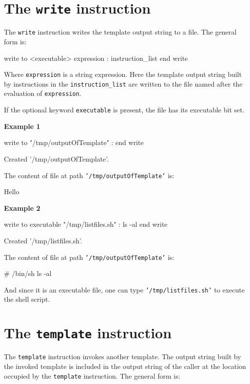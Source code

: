 \documentclass[10pt,openright,twosides]{report}
\newcommand{\gtltype}[1]{{\small\ttfamily #1}}
\newcommand{\gtlinline}[1]{\colorbox{light-blue}{\lstinline[language=gtl]{#1}}}
\newcommand{\examplen}[1]{\vspace{.75em}\noindent\textbf{Example #1}\vspace{0em}}
\begin{document}
\section{The \texttt{write} instruction}

The \gtlinline{write} instruction writes the template output string to a file. The general form is:

\begin{gtl}
write to <executable> expression :
  instruction_list
end write
\end{gtl}

Where \gtlinline{expression} is a \gtltype{string} expression. Here the template output string built by instructions in the \gtlinline{instruction_list} are written to the file named after the evaluation of \gtlinline{expression}. 

If the optional keyword \gtlinline{executable} is present, the file has its executable bit set.

\examplen{1}
\begin{gtl}
write to "/tmp/outputOfTemplate" :
%
end write
\end{gtl}
\begin{console}
Created '/tmp/outputOfTemplate'.
\end{console}

\noindent The content of file at path \texttt{\small '/tmp/outputOfTemplate'} is:
\begin{templateoutput}
Hello
\end{templateoutput}

\examplen{2}
\begin{gtl}
write to executable "/tmp/listfiles.sh" :
ls -al
%
end write
\end{gtl}
\begin{console}
Created '/tmp/listfiles.sh'.
\end{console}

\noindent The content of file at path \texttt{\small '/tmp/outputOfTemplate'} is:
\begin{templateoutput}
# /bin/sh
ls -al
\end{templateoutput}
And since it is an executable file, one can type \texttt{\small '/tmp/listfiles.sh'} to execute the shell script.

\section{The \texttt{template} instruction}

The \gtlinline{template} instruction invokes another template. The output string built by the invoked template is included in the output string of the caller at the location occupied by the \gtlinline{template} instruction. The general form is:
\end{document}
